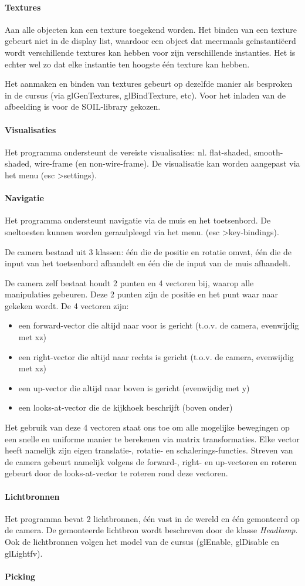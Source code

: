 \documentclass{article}
\begin{document}
\paragraph{Textures}Aan alle objecten kan een texture toegekend worden. Het binden van een texture gebeurt niet in de display list, waardoor een object dat meermaals geïnstantiëerd wordt verschillende textures kan hebben voor zijn verschillende instanties. Het is echter wel zo dat elke instantie ten hoogste één texture kan hebben.
\par
Het aanmaken en binden van textures gebeurt op dezelfde manier als besproken in de cursus (via glGenTextures, glBindTexture, etc). Voor het inladen van de afbeelding is voor de SOIL-library gekozen.

\paragraph{Visualisaties}Het programma ondersteunt de vereiste visualisaties: nl. flat-shaded, smooth-shaded, wire-frame (en non-wire-frame). De visualisatie kan worden aangepast via het menu (esc \textgreater \space settings).

\paragraph{Navigatie}Het programma ondersteunt navigatie via de muis en het toetsenbord. De sneltoesten kunnen worden geraadpleegd via het menu. (esc \textgreater \space key-bindings).
\par
De camera bestaad uit 3 klassen: één die de positie en rotatie omvat, één die de input van het toetsenbord afhandelt en één die de input van de muis afhandelt.
\par
De camera zelf bestaat houdt 2 punten en 4 vectoren bij, waarop alle manipulaties gebeuren. Deze 2 punten zijn de positie en het punt waar naar gekeken wordt. De 4 vectoren zijn:
\begin{itemize}
	\item een forward-vector die altijd naar voor is gericht (t.o.v. de camera, evenwijdig met xz)
	\item een right-vector die altijd naar rechts is gericht (t.o.v. de camera, evenwijdig met xz)
	\item een up-vector die altijd naar boven is gericht (evenwijdig met y)
	\item een looks-at-vector die de kijkhoek beschrijft (boven onder)
\end{itemize}
Het gebruik van deze 4 vectoren staat ons toe om alle mogelijke bewegingen op een snelle en uniforme manier te berekenen via matrix transformaties. Elke vector heeft namelijk zijn eigen translatie-, rotatie- en schalerings-functies. Streven van de camera gebeurt namelijk volgens de forward-, right- en up-vectoren en roteren gebeurt door de looks-at-vector te roteren rond deze vectoren.

\paragraph{Lichtbronnen}Het programma bevat 2 lichtbronnen, één vast in de wereld en één gemonteerd op de camera. De gemonteerde lichtbron wordt beschreven door de klasse \textit{Headlamp}. Ook de lichtbronnen volgen het model van de cursus (glEnable, glDisable en glLightfv).
\paragraph{Picking}
\end{document}
